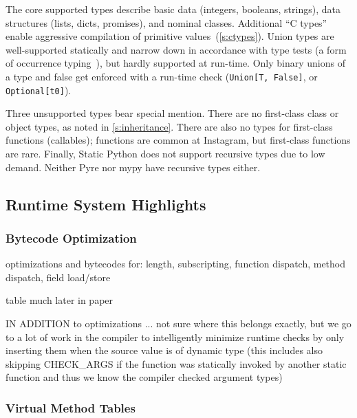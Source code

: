 \documentclass[english,cleveref,submission]{programming}
\newcommand{\SP}{Static Python}
\newcommand{\code}[1]{\texttt{#1}}
\begin{document}
The core supported types describe basic data (integers, booleans, strings),
data structures (lists, dicts, promises),
and nominal classes.
Additional ``C types'' enable aggressive compilation of primitive
values~(\cref{s:ctypes}).
Union types are well-supported statically and narrow down in accordance
with type tests (a form of occurrence typing~\cite{tf-icfp-2010,gsk-esop-2011}),
but hardly supported at run-time.
Only binary unions of a type and false get enforced with a run-time check
(\code{Union[T, False]}, or \code{Optional[t0]}).

Three unsupported types bear special mention.
There are no first-class class or object types, as noted in \cref{s:inheritance}.
There are also no types for first-class functions (callables);
functions are common at Instagram, but first-class functions are rare.
Finally, \SP{} does not support recursive types due to low demand.
Neither Pyre nor mypy have recursive types either.


\subsection{Runtime System Highlights}

\subsubsection{Bytecode Optimization}

optimizations and bytecodes for: length, subscripting, function dispatch, method dispatch, field load/store

table much later in paper 

IN ADDITION to optimizations ...
not sure where this belongs exactly, but we go to a lot of work in the compiler
to intelligently minimize runtime checks by only inserting them when the source
value is of dynamic type (this includes also skipping CHECK\_ARGS if the
function was statically invoked by another static function and thus we know the
compiler checked argument types)



\subsubsection{Virtual Method Tables}
\label{s:vtable}
\end{document}
